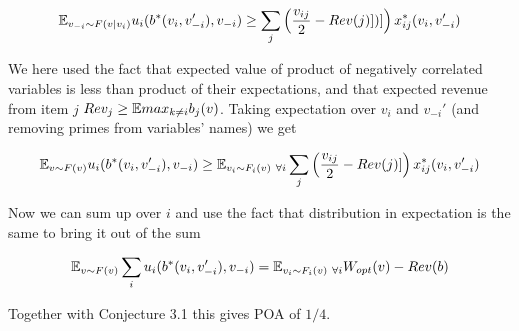 $${\mathbb{E}}_{v_{-i}\sim F(v|v_i)}u_i(b^*(v_i,v_{-i}'),v_{-i}) \geq \sum_j \left ( \frac{v_{ij}}{2}-Rev(j)])]\right)x^*_{ij}(v_i,v_{-i}')$$


We here used the fact that expected value of product of negatively correlated variables is less than product of their expectations, and that expected revenue from item $j$ $Rev_j\geq {\mathbb{E}} max_{k\neq i} b_j(v)$. Taking expectation over $v_i$ and $v_{-i}'$ (and removing primes from variables' names) we get

$${\mathbb{E}}_{v\sim F(v)}u_i(b^*(v_i,v_{-i}'),v_{-i}) \geq {\mathbb{E}}_{v_i\sim F_i(v)\ \forall i} \sum_j \left ( \frac{v_{ij}}{2}-Rev(j)]\right)x^*_{ij}(v_i,v_{-i}')$$

Now we can sum up over $i$ and use the fact that distribution in expectation is the same to bring it out of the sum

$${\mathbb{E}}_{v\sim F(v)}\sum_i u_i(b^*(v_i,v_{-i}'),v_{-i}) = {\mathbb{E}}_{v_i\sim F_i(v)\ \forall i}W_{opt}(v) - Rev(b)$$

Together with Conjecture 3.1 this gives POA of $1/4$.
